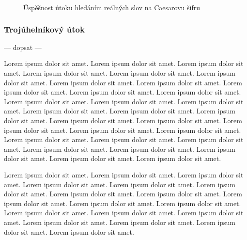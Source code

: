 \documentclass[glossaries, index]{kidiplom}
\begin{document}
\begin{figure}[htbp]
\centering
{}
\caption{Úspěšnost útoku hledáním reálných slov na Caesarovu šifru}
\label{caesar-real-words}
\end{figure}

\subsubsection{Trojúhelníkový útok}
--- dopsat ---

Lorem ipsum dolor sit amet. Lorem ipsum dolor sit amet. Lorem ipsum dolor sit amet. Lorem ipsum dolor sit amet. Lorem ipsum dolor sit amet. Lorem ipsum dolor sit amet. Lorem ipsum dolor sit amet. Lorem ipsum dolor sit amet. Lorem ipsum dolor sit amet. Lorem ipsum dolor sit amet. Lorem ipsum dolor sit amet. Lorem ipsum dolor sit amet. Lorem ipsum dolor sit amet. Lorem ipsum dolor sit amet. Lorem ipsum dolor sit amet. Lorem ipsum dolor sit amet. Lorem ipsum dolor sit amet. Lorem ipsum dolor sit amet. Lorem ipsum dolor sit amet. Lorem ipsum dolor sit amet. Lorem ipsum dolor sit amet. Lorem ipsum dolor sit amet. Lorem ipsum dolor sit amet. Lorem ipsum dolor sit amet. Lorem ipsum dolor sit amet. Lorem ipsum dolor sit amet. Lorem ipsum dolor sit amet. Lorem ipsum dolor sit amet. Lorem ipsum dolor sit amet. Lorem ipsum dolor sit amet. 

Lorem ipsum dolor sit amet. Lorem ipsum dolor sit amet. Lorem ipsum dolor sit amet. Lorem ipsum dolor sit amet. Lorem ipsum dolor sit amet. Lorem ipsum dolor sit amet. Lorem ipsum dolor sit amet. Lorem ipsum dolor sit amet. Lorem ipsum dolor sit amet. Lorem ipsum dolor sit amet. Lorem ipsum dolor sit amet. Lorem ipsum dolor sit amet. Lorem ipsum dolor sit amet. Lorem ipsum dolor sit amet. Lorem ipsum dolor sit amet. Lorem ipsum dolor sit amet. Lorem ipsum dolor sit amet. Lorem ipsum dolor sit amet. 
\end{document}
